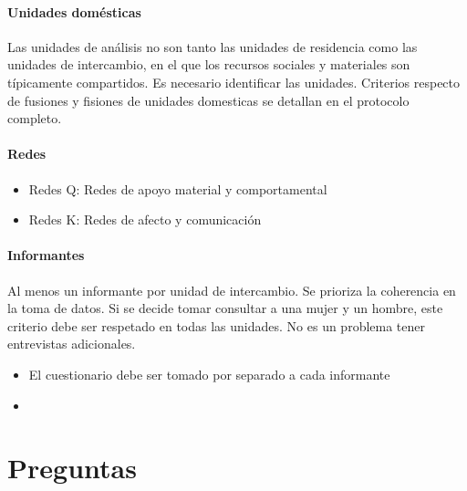 \documentclass[a4paper,10pt]{article}
\theoremstyle{definition}
\begin{document}
\paragraph{Unidades domésticas} Las unidades de análisis no son tanto las unidades de residencia como las unidades de intercambio, en el que los recursos sociales y materiales son típicamente compartidos. Es necesario identificar las unidades. Criterios respecto de fusiones y fisiones de unidades domesticas se detallan en el protocolo completo.

\paragraph{Redes}
\begin{itemize}\setlength\itemsep{0cm}
 \item Redes Q: Redes de apoyo material y comportamental
 \item Redes K: Redes de afecto y comunicación
\end{itemize}
 
\paragraph{Informantes} Al menos un informante por unidad de intercambio. Se prioriza la coherencia en la toma de datos. Si se decide tomar consultar a una mujer y un hombre, este criterio debe ser respetado en todas las unidades. No es un problema tener entrevistas adicionales.
\begin{itemize}\setlength\itemsep{0cm}
 \item El cuestionario debe ser tomado por separado a cada informante
 \item
\end{itemize}

\section{Preguntas}
\end{document}
